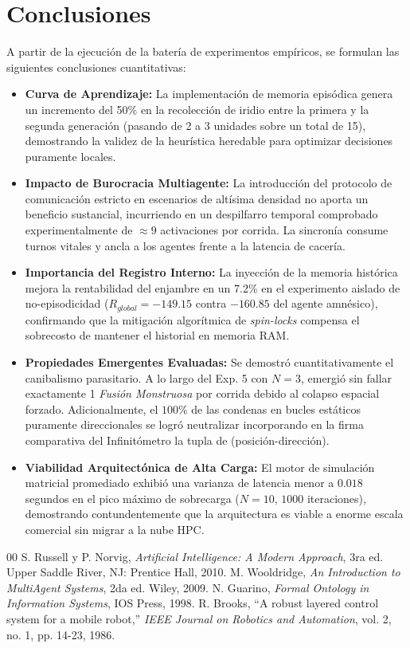\documentclass[conference]{IEEEtran}
\begin{document}
\section{Conclusiones}
A partir de la ejecución de la batería de experimentos empíricos, se formulan las siguientes conclusiones cuantitativas:
\begin{itemize}
    \item \textbf{Curva de Aprendizaje:} La implementación de memoria episódica genera un incremento del 50\% en la recolección de iridio entre la primera y la segunda generación (pasando de 2 a 3 unidades sobre un total de 15), demostrando la validez de la heurística heredable para optimizar decisiones puramente locales.
    \item \textbf{Impacto de Burocracia Multiagente:} La introducción del protocolo de comunicación estricto en escenarios de altísima densidad no aporta un beneficio sustancial, incurriendo en un despilfarro temporal comprobado experimentalmente de $\approx 9$ activaciones por corrida. La sincronía consume turnos vitales y ancla a los agentes frente a la latencia de cacería.
    \item \textbf{Importancia del Registro Interno:} La inyección de la memoria histórica mejora la rentabilidad del enjambre en un 7.2\% en el experimento aislado de no-episodicidad ($R_{global} = -149.15$ contra $-160.85$ del agente amnésico), confirmando que la mitigación algorítmica de \textit{spin-locks} compensa el sobrecosto de mantener el historial en memoria RAM.
    \item \textbf{Propiedades Emergentes Evaluadas:} Se demostró cuantitativamente el canibalismo parasitario. A lo largo del Exp. 5 con $N=3$, emergió sin fallar exactamente 1 \textit{Fusión Monstruosa} por corrida debido al colapso espacial forzado. Adicionalmente, el $100\%$ de las condenas en bucles estáticos puramente direccionales se logró neutralizar incorporando en la firma comparativa del Infinitómetro la tupla de (posición-dirección).
    \item \textbf{Viabilidad Arquitectónica de Alta Carga:} El motor de simulación matricial promediado exhibió una varianza de latencia menor a $0.018$ segundos en el pico máximo de sobrecarga ($N=10$, $1000$ iteraciones), demostrando contundentemente que la arquitectura es viable a enorme escala comercial sin migrar a la nube HPC.
\end{itemize}

\begin{thebibliography}{00}
 S. Russell y P. Norvig, \textit{Artificial Intelligence: A Modern Approach}, 3ra ed. Upper Saddle River, NJ: Prentice Hall, 2010.
 M. Wooldridge, \textit{An Introduction to MultiAgent Systems}, 2da ed. Wiley, 2009.
 N. Guarino, \textit{Formal Ontology in Information Systems}, IOS Press, 1998.
 R. Brooks, ``A robust layered control system for a mobile robot,'' \textit{IEEE Journal on Robotics and Automation}, vol. 2, no. 1, pp. 14-23, 1986.
\end{thebibliography}
\end{document}
